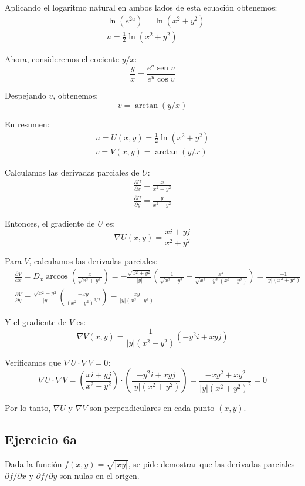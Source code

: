 \documentclass{report}
\begin{document}
    Aplicando el logaritmo natural en ambos lados de esta ecuación obtenemos:
    $$
    \begin{aligned}
    & \ln(e^{2u}) = \ln(x^2 + y^2) \\
    & u = \frac{1}{2} \ln(x^2 + y^2)
    \end{aligned}
    $$

    Ahora, consideremos el cociente $y / x$:
    $$
    \frac{y}{x} = \frac{e^u \operatorname{sen} v}{e^u \cos v}
    $$

    Despejando $v$, obtenemos:
    $$
    v = \arctan(y / x)
    $$

    En resumen:
    $$
    \begin{gathered}
    u = U(x, y) = \frac{1}{2} \ln(x^2 + y^2) \\
    v = V(x, y) = \arctan(y / x)
    \end{gathered}
    $$

    Calculamos las derivadas parciales de $U$:
    $$
    \begin{gathered}
    \frac{\partial U}{\partial x} = \frac{x}{x^2 + y^2} \\
    \frac{\partial U}{\partial y} = \frac{y}{x^2 + y^2}
    \end{gathered}
    $$

    Entonces, el gradiente de $U$ es:
    $$
    \nabla U(x, y) = \frac{x i + y j}{x^2 + y^2}
    $$

    Para $V$, calculamos las derivadas parciales:
    $$
    \begin{aligned}
    & \frac{\partial V}{\partial x} = D_x \arccos\left(\frac{x}{\sqrt{x^2 + y^2}}\right) = -\frac{\sqrt{x^2 + y^2}}{|y|} \left(\frac{1}{\sqrt{x^2 + y^2}} - \frac{x^2}{\sqrt{x^2 + y^2} (x^2 + y^2)}\right) = \frac{-1}{|y|(x^2 + y^2)} \\
    & \frac{\partial V}{\partial y} = \frac{\sqrt{x^2 + y^2}}{|y|} \left(\frac{-x y}{(x^2 + y^2)^{3/2}}\right) = \frac{x y}{|y|(x^2 + y^2)}
    \end{aligned}
    $$

    Y el gradiente de $V$ es:
    $$
    \nabla V(x, y) = \frac{1}{|y|(x^2 + y^2)} (-y^2 i + x y j)
    $$

    Verificamos que $\nabla U \cdot \nabla V = 0$:
    $$
    \nabla U \cdot \nabla V = \left(\frac{x i + y j}{x^2 + y^2}\right) \cdot \left(\frac{-y^2 i + x y j}{|y|(x^2 + y^2)}\right) = \frac{-x y^2 + x y^2}{|y| (x^2 + y^2)^2} = 0
    $$

    Por lo tanto, $\nabla U$ y $\nabla V$ son perpendiculares en cada punto $(x, y)$.\subsection*{Ejercicio 6a}
    Dada la función $f(x, y)=\sqrt{|x y|}$, se pide demostrar que las derivadas parciales $\partial f / \partial x$ y $\partial f / \partial y$ son nulas en el origen.
\end{document}
